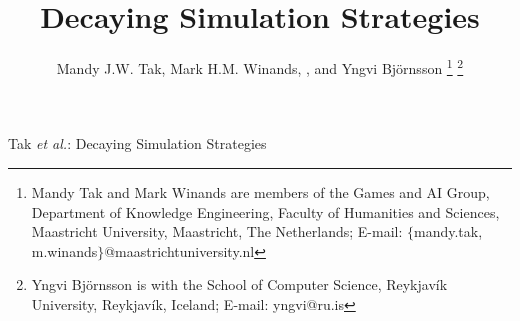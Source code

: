 \documentclass[journal]{IEEEtran}
\begin{document}
%
\title{Decaying Simulation Strategies}
%
%
%
\author{Mandy J.W. Tak, Mark H.M. Winands, , and Yngvi Bj{\"o}rnsson
\thanks{Mandy Tak and Mark Winands are members of the Games and
AI Group, Department of Knowledge Engineering, Faculty of Humanities
and Sciences, Maastricht University, Maastricht, The Netherlands; E-mail:
$\{$mandy.tak, m.winands$\}$@maastrichtuniversity.nl} \thanks{Yngvi Bj{\"o}rnsson is with the School of Computer Science, Reykjav{\'i}k
University, Reykjav{\'i}k, Iceland; E-mail: yngvi@ru.is}%
}

% 
%



%
{Tak \MakeLowercase{\textit{et al.}}: Decaying Simulation Strategies}
% 
\end{document}
